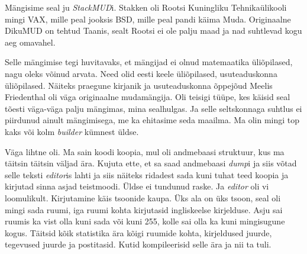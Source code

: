 Mängisime seal ju \emph{StackMUD}i. Stakken oli Rootsi 
Kuningliku Tehnikaülikooli mingi 
VAX, mille peal 
jooksis BSD, mille peal pandi käima Muda. 
Originaalne DikuMUD on tehtud Taanis, sealt Rootsi ei ole palju maad ja nad 
suhtlevad kogu aeg omavahel.

Selle mängimise tegi huvitavaks, et mängijad ei olnud  matemaatika üliõpilased, 
nagu oleks võinud arvata. Need olid eesti keele üliõpilased, usuteaduskonna 
üliõpilased. Näiteks praegune kirjanik ja usuteaduskonna õppejõud Meelis 
Friedenthal oli väga originaalne mudamängija. 
Oli teisigi tüüpe, kes  käisid seal tõesti väga-väga palju mängimas, mina 
sealhulgas. Ja selle seltskonnaga suhtlus ei  piirdunud ainult 
mängimisega, me ka ehitasime seda maailma. Ma olin mingi top kaks või kolm 
\emph{builder} kümnest üldse.


Väga lihtne oli. Ma sain koodi koopia, mul oli andmebaasi struktuur, kus ma 
täitsin täitsin väljad ära. Kujuta ette, et sa saad andmebaasi \emph{dump}i ja 
siis võtad selle teksti \emph{editor}is lahti ja siis  näiteks ridadest sada 
kuni tuhat teed koopia ja  kirjutad sinna asjad teistmoodi. Üldse ei tundunud 
raske. Ja \emph{editor} oli vi 
loomulikult. Kirjutamine käis tsoonide kaupa. Üks ala on üks tsoon, seal oli 
mingi sada ruumi, iga ruumi kohta kirjutasid ingliskeelse kirjelduse. Asju sai 
ruumis ka vist olla kuni sada või kuni 255, kolle sai olla ka kuni mingisugune 
kogus. Täitsid kõik statistika ära kõigi ruumide kohta, kirjeldused juurde, 
tegevused juurde ja postitasid. Kutid kompileerisid selle ära ja nii ta tuli. 

